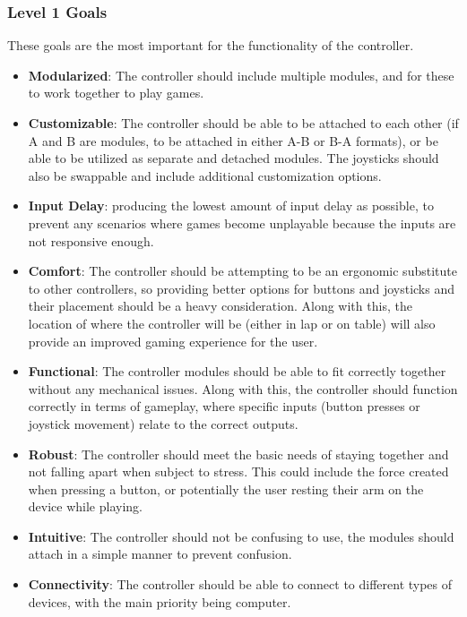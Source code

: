\documentclass[a4]{article}
\begin{document}
\subsubsection{Level 1 Goals}
These goals are the most important for the functionality of the controller.
\begin{itemize}
    \item \textcolor{McMasterMaroon}{\textbf{Modularized}}: The controller should include multiple modules, and for these to work together to play games.
    \item \textcolor{McMasterMaroon}{\textbf{Customizable}}: The controller should be able to be attached to each other (if A and B are modules, to be attached in either A-B or B-A formats), or be able to be utilized as separate and detached modules.
        The joysticks should also be swappable and include additional customization options.
    \item \textcolor{McMasterMaroon}{\textbf{Input Delay}}: producing the lowest amount of input delay as possible, to prevent any scenarios where games become unplayable because the inputs are not responsive enough.
    \item \textcolor{McMasterMaroon}{\textbf{Comfort}}: The controller should be attempting to be an ergonomic substitute to other controllers, so providing better options for buttons and joysticks and their placement should be a heavy consideration. 
        Along with this, the location of where the controller will be (either in lap or on table) will also provide an improved gaming experience for the user.
    \item \textcolor{McMasterMaroon}{\textbf{Functional}}: The controller modules should be able to fit correctly together without any mechanical issues. Along with this, the controller should function correctly in terms of gameplay, where specific inputs (button presses or joystick movement) relate to the correct outputs.
    \item \textcolor{McMasterMaroon}{\textbf{Robust}}: The controller should meet the basic needs of staying together and not falling apart when subject to stress. This could include the force created when pressing a button, or potentially the user resting their arm on the device while playing.
    \item \textcolor{McMasterMaroon}{\textbf{Intuitive}}: The controller should not be confusing to use, the modules should attach in a simple manner to prevent confusion.
    \item \textcolor{McMasterMaroon}{\textbf{Connectivity}}: The controller should be able to connect to different types of devices, with the main priority being computer.   
\end{itemize}
\end{document}
